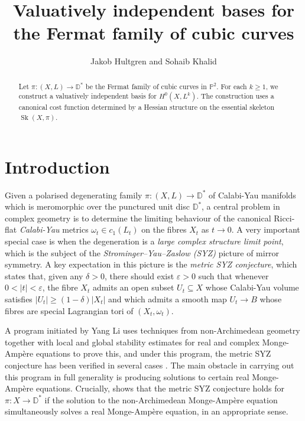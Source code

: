 \documentclass{article}
\title{Valuatively independent bases for the Fermat family of cubic curves}
\author{Jakob Hultgren and Sohaib Khalid}
\newcommand{\CC}{\mathbb{C}}
\newcommand{\op}[1]{\operatorname{#1}}
\begin{document}
\maketitle

\begin{abstract}
    Let $\pi:(X,L)\rightarrow \mathbb D^*$ be the Fermat family of cubic curves in $\mathbb P^2$. For each $k\geq 1$, we construct a valuatively independent basis for $H^0(X,L^k)$. The construction uses a canonical cost function determined by a Hessian structure on the essential skeleton $\op{Sk}(X,\pi)$.
\end{abstract}

\section{Introduction}
Given a polarised degenerating family $\pi:(X,L) \to \mathbb D^*$ of Calabi-Yau manifolds which is meromorphic over the punctured unit disc $\mathbb D^*$, a central problem in complex geometry is to determine the limiting behaviour of the canonical Ricci-flat \emph{Calabi-Yau} metrics $\omega_t\in c_1(L_t)$ on the fibres $X_t$ as $t\to 0$. A very important special case is when the degeneration is a \emph{large complex structure limit point}, which is the subject of the \emph{Strominger--Yau--Zaslow (SYZ)} picture of mirror symmetry. A key expectation in this picture is the \emph{metric SYZ conjecture}, which states that, given any $\delta>0$, there should exist $\varepsilon > 0$ such that whenever $0< |t|<\varepsilon$, the fibre $X_t$ admits an open subset 
$U_t\subseteq X$ whose Calabi-Yau volume satisfies $|U_t|\geq (1-\delta)|X_t|$
and which admits a smooth map $U_t\to B$ whose fibres are special Lagrangian tori of $(X_t,\omega_t)$. 

A program initiated by Yang Li uses techniques from non-Archimedean geometry together with local and global stability estimates for real and complex Monge-Ampère equations to prove this, and under this program, the metric SYZ conjecture has been verified in several cases \cite{LiFermat,PS,HJMM,LiToric,AH}. The main obstacle in carrying out this program in full generality is producing solutions to certain real Monge-Ampère equations. Crucially, \cite{LiNA} shows that the metric SYZ conjecture holds for $\pi:X\to \mathbb D^*$ if the solution to the non-Archimedean Monge-Ampère equation simultaneously solves a real Monge-Ampère equation, in an appropriate sense. 
\end{document}
